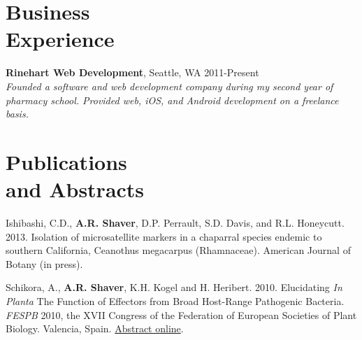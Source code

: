 \documentclass[margin,line]{resume}
\begin{document}
\begin{resume}
    
    \section{\mysidestyle Business\\Experience}

    {\bf Rinehart Web Development}, Seattle, WA \hfill 2011-Present\\
    {\sl Founded a software and web development company during my second year of pharmacy school. Provided web, iOS, and Android development on a freelance basis.}


    \section{\mysidestyle Publications\\and Abstracts}

	Ishibashi, C.D., {\bf A.R. Shaver}, D.P. Perrault, S.D. Davis, and R.L. Honeycutt. 2013. Isolation of microsatellite markers in a chaparral species endemic to southern California, Ceanothus megacarpus (Rhamnaceae). American Journal of Botany (in press).

   Schikora, A., {\bf A.R. Shaver}, K.H. Kogel and H. Heribert. 2010. Elucidating {\it In Planta} The Function of Effectors from Broad Host-Range Pathogenic Bacteria. {\it FESPB} 2010, the XVII Congress of the Federation of European Societies of Plant Biology. Valencia, Spain. \href{http://www.geyseco.es/fespb/principal.php?seccion=abstract/abstract_view_search&idcomunicacion=918}{Abstract online}.



\end{resume}
\end{document}
